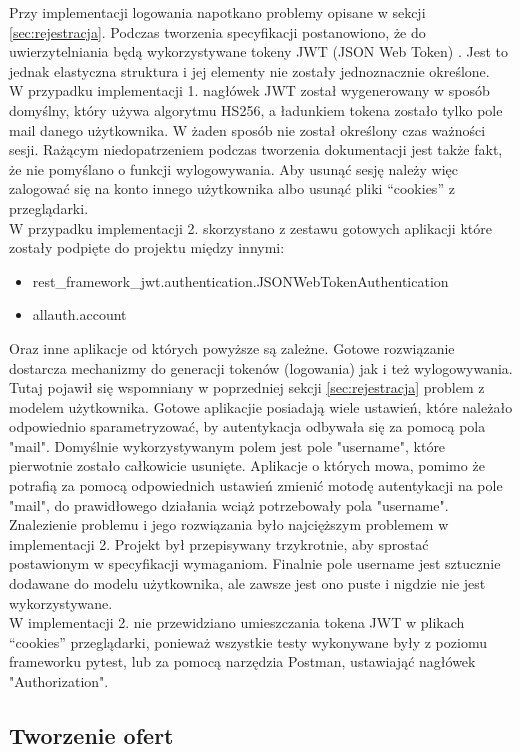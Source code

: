 \documentclass[12pt, notitlepage]{article}
\begin{document}
Przy implementacji logowania napotkano problemy opisane w sekcji \ref{sec:rejestracja}. Podczas tworzenia specyfikacji postanowiono, że do uwierzytelniania będą wykorzystywane tokeny JWT (JSON Web Token) \cite{jwt}. Jest to jednak elastyczna struktura i jej elementy nie zostały jednoznacznie określone. \\
W przypadku implementacji 1. nagłówek JWT został wygenerowany w sposób domyślny, który używa algorytmu HS256, a ładunkiem tokena zostało tylko pole mail danego użytkownika. W żaden sposób nie został określony czas ważności sesji. Rażącym niedopatrzeniem podczas tworzenia dokumentacji jest także fakt, że nie pomyślano o funkcji wylogowywania. Aby usunąć sesję należy więc zalogować się na konto innego użytkownika albo usunąć pliki ``cookies'' z przeglądarki.  \\
W przypadku implementacji 2. skorzystano z zestawu gotowych aplikacji które zostały podpięte do projektu między innymi: 
\begin{itemize}
    \item rest\_framework\_jwt.authentication.JSONWebTokenAuthentication
    \item allauth.account
\end{itemize}
Oraz inne aplikacje od których powyższe są zależne. Gotowe rozwiązanie dostarcza mechanizmy do generacji tokenów (logowania) jak i też wylogowywania. Tutaj pojawił się wspomniany w poprzedniej sekcji \ref{sec:rejestracja} problem z modelem użytkownika. Gotowe aplikacjie posiadają wiele ustawień, które należało odpowiednio sparametryzować, by autentykacja odbywała się za pomocą pola "mail". Domyślnie wykorzystywanym polem jest pole "username", które pierwotnie zostało całkowicie usunięte. Aplikacje o których mowa, pomimo że potrafią za pomocą odpowiednich ustawień zmienić motodę autentykacji na pole "mail", do prawidłowego działania wciąż potrzebowały pola "username". Znalezienie problemu i jego rozwiązania było najcięższym problemem w implementacji 2. Projekt był przepisywany trzykrotnie, aby sprostać postawionym w specyfikacji wymaganiom. Finalnie pole username jest sztucznie dodawane do modelu użytkownika, ale zawsze jest ono puste i nigdzie nie jest wykorzystywane.  \\
W implementacji 2. nie przewidziano umieszczania tokena JWT w plikach ``cookies'' przeglądarki, ponieważ wszystkie testy wykonywane były z poziomu frameworku pytest, lub za pomocą narzędzia Postman, ustawiająć nagłówek "Authorization".

\subsection{Tworzenie ofert}
\end{document}
